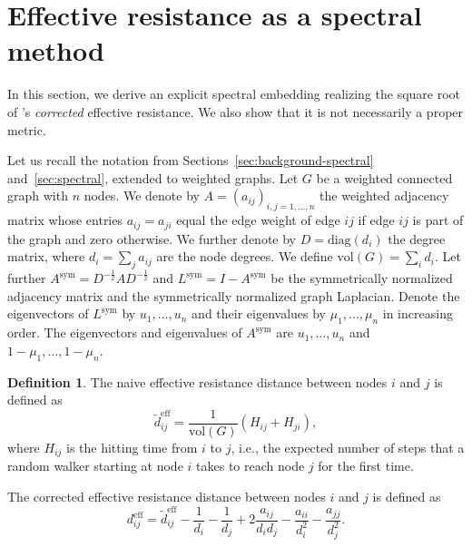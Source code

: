 \documentclass{article}
\newcommand{\asym}{A^{\text{sym}}}
\newcommand{\lsym}{L^{\text{sym}}}
\theoremstyle{plain}
\theoremstyle{definition}
\newtheorem{definition}[theorem]{Definition}
\theoremstyle{remark}
\begin{document}
\section{Effective resistance as a spectral method}
\label{app:eff_res}

In this section, we derive an explicit spectral embedding realizing the square root of \citet{luxburg2010getting}'s \textit{corrected} effective resistance. We also show that it is not necessarily a proper metric.

Let us recall the notation from Sections~\ref{sec:background-spectral} and~\ref{sec:spectral}, extended to weighted graphs. Let $G$ be a weighted connected graph with $n$ nodes. We denote by $A = (a_{ij})_{i, j = 1, \dots, n}$ the weighted adjacency matrix whose entries $a_{ij}=a_{ji}$ equal the edge weight of edge $ij$ if edge $ij$ is part of the graph and zero otherwise. We further denote by $D = \text{diag}(d_i)$ the degree matrix, where \mbox{$d_i = \sum_j a_{ij}$} are the node degrees. We define $\text{vol}(G) = \sum_i d_i$. Let further $\asym = D^{-\frac{1}{2}} A D^{-\frac{1}{2}}$  and $\lsym = I - \asym$ be the symmetrically normalized adjacency matrix and the symmetrically normalized graph Laplacian. Denote the eigenvectors of $\lsym$ by $u_1, \dots, u_n$ and their eigenvalues by $\mu_1, \dots, \mu_n$ in increasing order. The eigenvectors and eigenvalues of $\asym$ are $u_1,\dots, u_n$ and $1-\mu_1, \dots, 1-\mu_n$.


\begin{definition}
    The naive effective resistance distance between nodes $i$ and $j$ is defined as 
    \begin{equation}
        \tilde{d}^{\text{eff}}_{ij} = \frac{1}{\text{vol}(G)} (H_{ij} + H_{ji}), 
    \end{equation}
    where $H_{ij}$ is the hitting time from $i$ to $j$, i.e., the expected number of steps that a random walker starting at node $i$ takes to reach node $j$ for the first time.
    
    The corrected effective resistance distance between nodes $i$ and $j$ is defined as 
    \begin{equation}
        d^{\text{eff}}_{ij} = \tilde{d}^{\text{eff}}_{ij} - \frac{1}{d_i} - \frac{1}{d_j} + 2 \frac{a_{ij}}{d_id_j} - \frac{a_{ii}}{d_i^2} - \frac{a_{jj}}{d_j^2}.
    \end{equation}
\end{definition}
\end{document}

